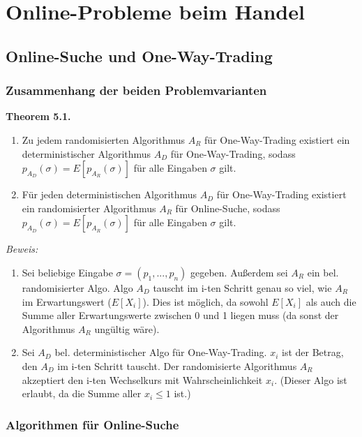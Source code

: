 \chapter{Online-Probleme beim Handel}


\section{Online-Suche und One-Way-Trading}

\subsection{Zusammenhang der beiden Problemvarianten}

\textbf{Theorem 5.1.}
\begin{enumerate}
\item Zu jedem randomisierten Algorithmus $A_{R}$ für One-Way-Trading existiert ein deterministischer Algorithmus $A_{D}$ für One-Way-Trading, sodass $p_{A_{D}}(\sigma) = E[p_{A_{R}}(\sigma)]$ für alle Eingaben $\sigma$ gilt.
\item Für jeden deterministischen Algorithmus $A_{D}$ für One-Way-Trading existiert ein randomisierter Algorithmus $A_{R}$ für Online-Suche, sodass $p_{A_{D}}(\sigma) = E[p_{A_{R}}(\sigma)]$ für alle Eingaben $\sigma$ gilt.
\end{enumerate}

\textit{Beweis:}
\begin{enumerate}
\item Sei beliebige Eingabe $\sigma = (p_{1}, ..., p_{n})$ gegeben. Außerdem sei $A_{R}$ ein bel. randomisierter Algo. Algo $A_{D}$ tauscht im i-ten Schritt genau so viel, wie $A_{R}$ im Erwartungswert ($E[X_{i}]$). Dies ist möglich, da sowohl $E[X_{i}]$ als auch die Summe aller Erwartungswerte zwischen 0 und 1 liegen muss (da sonst der Algorithmus $A_{R}$ ungültig wäre). \\
\item Sei $A_{D}$ bel. deterministischer Algo für One-Way-Trading. $x_{i}$ ist der Betrag, den $A_{D}$ im i-ten Schritt tauscht. Der randomisierte Algorithmus $A_{R}$ akzeptiert den i-ten Wechselkurs mit Wahrscheinlichkeit $x_{i}$. (Dieser Algo ist erlaubt, da die Summe aller $x_{i} \le 1$ ist.)
\end{enumerate}

\subsection{Algorithmen für Online-Suche}

